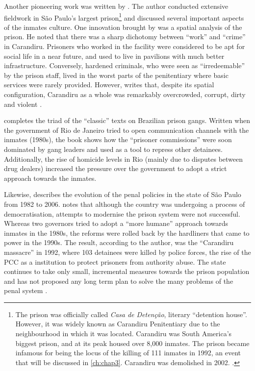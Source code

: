 Another pioneering work was written by \citet[]{ramalho1979mundo}. The author conducted extensive fieldwork in S\~{a}o Paulo's largest prison\footnote{The prison was officially called \textit{Casa de Deten\c{c}\~{a}o}, literary ``detention house''. However, it was widely known as Carandiru Penitentiary due to the neighbourhood in which it was located. Carandiru was South America's biggest prison, and at its peak housed over 8,000 inmates. The prison became infamous for being the locus of the killing of 111 inmates in 1992, an event that will be discussed in \autoref{ch:chap3}. Carandiru was demolished in 2002. \citep{ferreira2012massacre, varella1999estaccao}.} and discussed several important aspects of the inmates culture. One innovation brought by \citeauthor[]{ramalho1979mundo} was a spatial analysis of the prison. He noted that there was a sharp dichotomy between ``work'' and ``crime'' in Carandiru. Prisoners who worked in the facility were considered to be apt for social life in a near future, and used to live in pavilions with much better infrastructure. Conversely, hardened criminals, who were seen as ``irredeemable'' by the prison staff, lived in the worst parts of the penitentiary where basic services were rarely provided. However, \citeauthor[]{ramalho1979mundo} writes that, despite its spatial configuration, Carandiru as a whole was remarkably overcrowded, corrupt, dirty and violent \citep[376]{dias2011pulverizaccao}.

\citet[]{coelho1987oficina} completes the triad of the ``classic'' texts on Brazilian prison gangs. Written when the government of Rio de Janeiro tried to open communication channels with the inmates (1980s), the book shows how the ``prisoner commissions'' were soon dominated by gang leaders and used as a tool to repress other detainees. Additionally, the rise of homicide levels in Rio (mainly due to disputes between drug dealers) increased the pressure over the government to adopt a strict approach towards the inmates. 

Likewise, \citet[]{salla2007montoro} describes the evolution of the penal policies in the state of S\~{a}o Paulo from 1982 to 2006. \citeauthor[]{salla2007montoro} notes that although the country was undergoing a process of democratisation, attempts to modernise the prison system were not successful. Whereas two governors tried to adopt a ``more humane'' approach towards inmates in the 1980s, the reforms were rolled back by the hardliners that came to power in the 1990s. The result, according to the author, was the ``Carandiru massacre'' in 1992, where 103 detainees were killed by police forces, the rise of the PCC as a institution to protect prisoners from authority abuse. The state continues to take only small, incremental measures towards the prison population and has not proposed any long term plan to solve the many problems of the penal system \citep[383]{dias2011pulverizaccao}.

